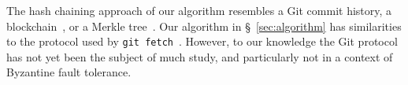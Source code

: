 \documentclass[a4paper,anonymous,USenglish]{lipics-v2019}
\begin{document}
The hash chaining approach of our algorithm resembles a Git commit history, a blockchain~\cite{Bano:2019}, or a Merkle tree~\cite{Merkle:1987}.
Our algorithm in \S~\ref{sec:algorithm} has similarities to the protocol used by \texttt{git fetch}~\cite{GitHTTP}.
However, to our knowledge the Git protocol has not yet been the subject of much study, and particularly not in a context of Byzantine fault tolerance.












\end{document}
